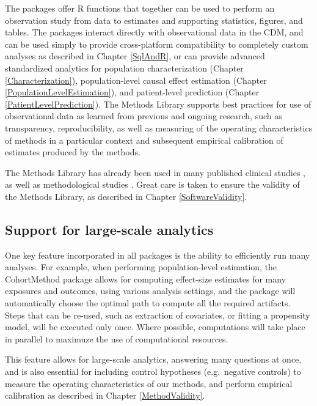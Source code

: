 \documentclass[11pt]{book}
\theoremstyle{definition}
\theoremstyle{definition}
\theoremstyle{definition}
\theoremstyle{remark}
\begin{document}
The packages offer R functions that together can be used to perform an observation study from data to estimates and supporting statistics, figures, and tables. The packages interact directly with observational data in the CDM, and can be used simply to provide cross-platform compatibility to completely custom analyses as described in Chapter \ref{SqlAndR}, or can provide advanced standardized analytics for population characterization (Chapter \ref{Characterization}), population-level causal effect estimation (Chapter \ref{PopulationLevelEstimation}), and patient-level prediction (Chapter \ref{PatientLevelPrediction}). The Methods Library supports best practices for use of observational data as learned from previous and ongoing research, such as transparency, reproducibility, as well as measuring of the operating characteristics of methods in a particular context and subsequent empirical calibration of estimates produced by the methods.

The Methods Library has already been used in many published clinical studies \citep{boland_2017, duke_2017, ramcharran_2017, weinstein_2017, wang_2017, ryan_2017, ryan_2018, vashisht_2018, yuan_2018, johnston_2019}, as well as methodological studies \citep{schuemie_2014, schuemie_2016, reps2018, tian_2018, schuemie_2018, schuemie_2018b, reps_2019}. Great care is taken to ensure the validity of the Methods Library, as described in Chapter \ref{SoftwareValidity}.

\hypertarget{support-for-large-scale-analytics}{%
\subsection{Support for large-scale analytics}\label{support-for-large-scale-analytics}}

One key feature incorporated in all packages is the ability to efficiently run many analyses. For example, when performing population-level estimation, the CohortMethod package allows for computing effect-size estimates for many exposures and outcomes, using various analysis settings, and the package will automatically choose the optimal path to compute all the required artifacts. Steps that can be re-used, such as extraction of covariates, or fitting a propensity model, will be executed only once. Where possible, computations will take place in parallel to maximuze the use of computational resources.

This feature allows for large-scale analytics, answering many questions at once, and is also essential for including control hypotheses (e.g.~negative controls) to measure the operating characteristics of our methods, and perform empirical calibration as described in Chapter \ref{MethodValidity}.
\end{document}
